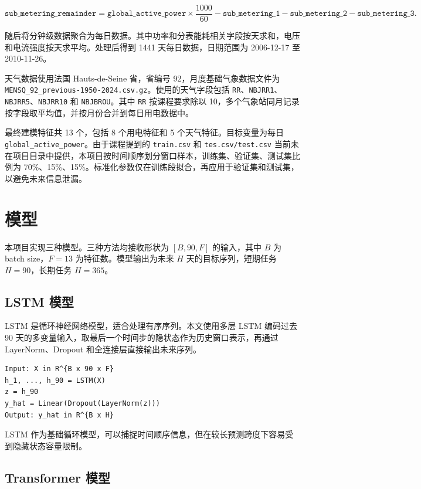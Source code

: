 \documentclass[UTF8,a4paper,12pt]{ctexart}
\begin{document}
\begin{equation}
\texttt{sub\_metering\_remainder}
= \texttt{global\_active\_power} \times \frac{1000}{60}
- \texttt{sub\_metering\_1}
- \texttt{sub\_metering\_2}
- \texttt{sub\_metering\_3}.
\end{equation}

随后将分钟级数据聚合为每日数据。其中功率和分表能耗相关字段按天求和，电压和电流强度按天求平均。处理后得到 1441 天每日数据，日期范围为 2006-12-17 至 2010-11-26。

天气数据使用法国 Hauts-de-Seine 省，省编号 92，月度基础气象数据文件为 \texttt{MENSQ\_92\_previous-1950-2024.csv.gz}。使用的天气字段包括 \texttt{RR}、\texttt{NBJRR1}、\texttt{NBJRR5}、\texttt{NBJRR10} 和 \texttt{NBJBROU}。其中 \texttt{RR} 按课程要求除以 10，多个气象站同月记录按字段取平均值，并按月份合并到每日用电数据中。

最终建模特征共 13 个，包括 8 个用电特征和 5 个天气特征。目标变量为每日 \texttt{global\_active\_power}。由于课程提到的 \texttt{train.csv} 和 \texttt{tes.csv/test.csv} 当前未在项目目录中提供，本项目按时间顺序划分窗口样本，训练集、验证集、测试集比例为 70\%、15\%、15\%。标准化参数仅在训练段拟合，再应用于验证集和测试集，以避免未来信息泄漏。

\section{模型}

本项目实现三种模型。三种方法均接收形状为 $[B, 90, F]$ 的输入，其中 $B$ 为 batch size，$F=13$ 为特征数。模型输出为未来 $H$ 天的目标序列，短期任务 $H=90$，长期任务 $H=365$。

\subsection{LSTM 模型}

LSTM 是循环神经网络模型，适合处理有序序列。本文使用多层 LSTM 编码过去 90 天的多变量输入，取最后一个时间步的隐状态作为历史窗口表示，再通过 LayerNorm、Dropout 和全连接层直接输出未来序列。

\begin{verbatim}
Input: X in R^{B x 90 x F}
h_1, ..., h_90 = LSTM(X)
z = h_90
y_hat = Linear(Dropout(LayerNorm(z)))
Output: y_hat in R^{B x H}
\end{verbatim}

LSTM 作为基础循环模型，可以捕捉时间顺序信息，但在较长预测跨度下容易受到隐藏状态容量限制。

\subsection{Transformer 模型}
\end{document}
